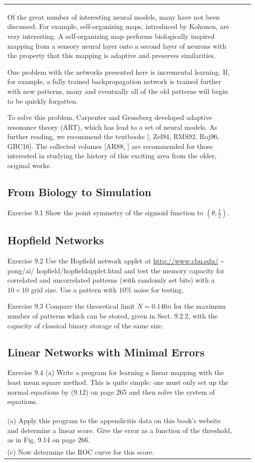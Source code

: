 \documentclass[10pt]{book}
\begin{document}
\begin{center}
\begin{tabular}{|l|l|l|}
Of the great number of interesting neural models, many have not been discussed. For example, self-organizing maps, introduced by Kohonen, are very interesting. A self-organizing map performs biologically inspired mapping from a sensory neural layer onto a second layer of neurons with the property that this mapping is adaptive and preserves similarities.

One problem with the networks presented here is incremental learning. If, for example, a fully trained backpropagation network is trained further with new patterns, many and eventually all of the old patterns will begin to be quickly forgotten.

To solve this problem, Carpenter and Grossberg developed adaptive resonance theory (ART), which has lead to a set of neural models.
As further reading, we recommend the textbooks [\cite{bis05}, Zel94, RMS92, Roj96, GBC16]. The collected volumes [AR88, \cite{apr90}] are recommended for those interested in studying the history of this exciting area from the older, original works.

\subsection{From Biology to Simulation}
Exercise 9.1 Show the point symmetry of the sigmoid function to $\left(\theta, \frac{1}{2}\right)$.

\subsection{Hopfield Networks}
Exercise 9.2 Use the Hopfield network applet at \href{http://www.cbu.edu/}{http://www.cbu.edu/} \~{} pong/ai/ hopfield/hopfieldapplet.html and test the memory capacity for correlated and uncorrelated patterns (with randomly set bits) with a $10 \times 10$ grid size. Use a pattern with $10 \%$ noise for testing.

Exercise 9.3 Compare the theoretical limit $N=0.146 n$ for the maximum number of patterns which can be stored, given in Sect. 9.2.2, with the capacity of classical binary storage of the same size.

\subsection{Linear Networks with Minimal Errors}
Exercise 9.4
(a) Write a program for learning a linear mapping with the least mean square method. This is quite simple: one must only set up the normal equations by (9.12) on page 265 and then solve the system of equations.\\
(a) Apply this program to the appendicitis data on this book's website and determine a linear score. Give the error as a function of the threshold, as in Fig. 9.14 on page 266.\\
(c) Now determine the ROC curve for this score.


\end{tabular}
\end{center}
\end{document}
